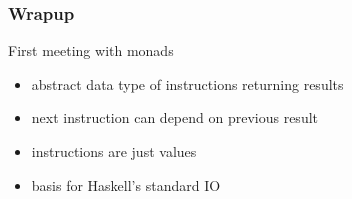 \documentclass{beamer}
\begin{document}
\begin{frame}
  \frametitle{Wrapup}
  \begin{alertblock}{First meeting with monads}
  \begin{itemize}
  \item abstract data type of instructions returning results
  \item next instruction can depend on previous result
  \item instructions are just values
  \item basis for Haskell's standard IO
  \end{itemize}
  \end{alertblock}
\end{frame}

\end{document}
